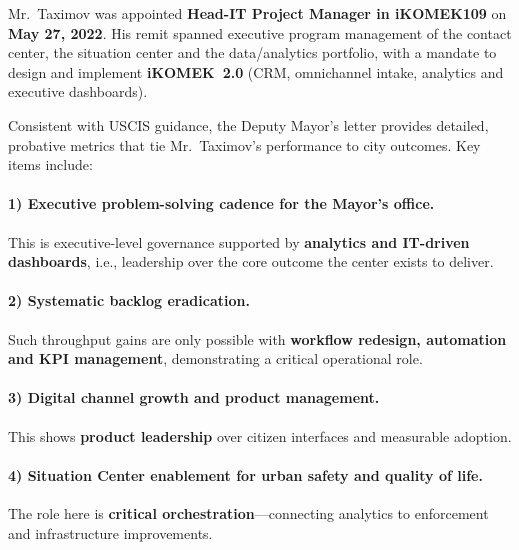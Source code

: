 Mr.\ Taximov was appointed \textbf{Head-IT Project Manager in iKOMEK109} on \textbf{May 27, 2022}. His remit spanned executive program management of the contact center, the situation center and the data/analytics portfolio, with a mandate to design and implement \textbf{iKOMEK~2.0} (CRM, omnichannel intake, analytics and executive dashboards). 

Consistent with USCIS guidance, the Deputy Mayor's letter provides detailed, probative metrics that tie Mr.\ Taximov’s performance to city outcomes. Key items include:

\paragraph{1) Executive problem-solving cadence for the Mayor’s office.}
This is executive-level governance supported by \textbf{analytics and IT-driven dashboards}, i.e., leadership over the core outcome the center exists to deliver.

\paragraph{2) Systematic backlog eradication.}
Such throughput gains are only possible with \textbf{workflow redesign, automation and KPI management}, demonstrating a critical operational role.

\paragraph{3) Digital channel growth and product management.}
This shows \textbf{product leadership} over citizen interfaces and measurable adoption.

\paragraph{4) Situation Center enablement for urban safety and quality of life.}
The role here is \textbf{critical orchestration}—connecting analytics to enforcement and infrastructure improvements.

